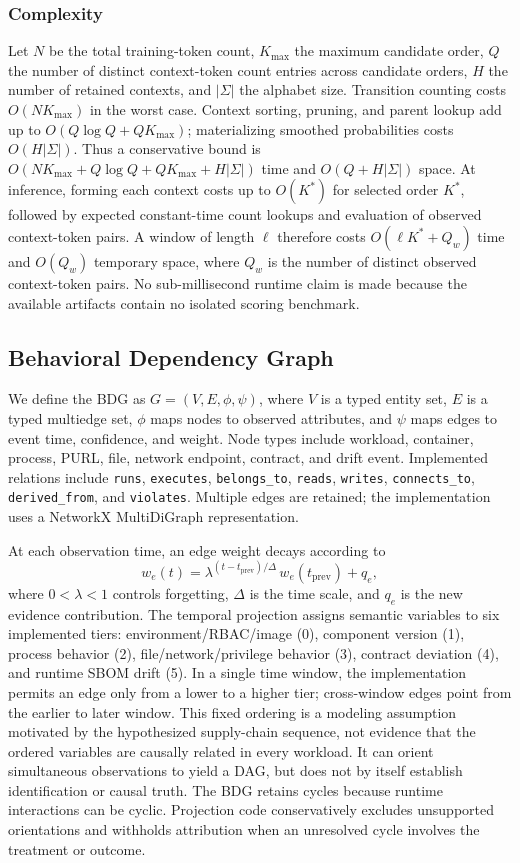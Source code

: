 \documentclass[conference]{IEEEtran}
\begin{document}
\subsubsection{Complexity}
Let $N$ be the total training-token count, $K_{\max}$ the maximum candidate order, $Q$ the number of distinct context-token count entries across candidate orders, $H$ the number of retained contexts, and $|\Sigma|$ the alphabet size. Transition counting costs $O(NK_{\max})$ in the worst case. Context sorting, pruning, and parent lookup add up to $O(Q\log Q+QK_{\max})$; materializing smoothed probabilities costs $O(H|\Sigma|)$. Thus a conservative bound is $O(NK_{\max}+Q\log Q+QK_{\max}+H|\Sigma|)$ time and $O(Q+H|\Sigma|)$ space. At inference, forming each context costs up to $O(K^*)$ for selected order $K^*$, followed by expected constant-time count lookups and evaluation of observed context-token pairs. A window of length $\ell$ therefore costs $O(\ell K^*+Q_w)$ time and $O(Q_w)$ temporary space, where $Q_w$ is the number of distinct observed context-token pairs. No sub-millisecond runtime claim is made because the available artifacts contain no isolated scoring benchmark.

\subsection{Behavioral Dependency Graph}
We define the BDG as $G=(V,E,\phi,\psi)$, where $V$ is a typed entity set, $E$ is a typed multiedge set, $\phi$ maps nodes to observed attributes, and $\psi$ maps edges to event time, confidence, and weight. Node types include workload, container, process, PURL, file, network endpoint, contract, and drift event. Implemented relations include \texttt{runs}, \texttt{executes}, \texttt{belongs\_to}, \texttt{reads}, \texttt{writes}, \texttt{connects\_to}, \texttt{derived\_from}, and \texttt{violates}. Multiple edges are retained; the implementation uses a NetworkX MultiDiGraph representation.

At each observation time, an edge weight decays according to
\begin{equation}
w_e(t)=\lambda^{(t-t_{\mathrm{prev}})/\Delta}\,w_e(t_{\mathrm{prev}})+q_e,
\label{eq:weight-decay}
\end{equation}
where $0<\lambda<1$ controls forgetting, $\Delta$ is the time scale, and $q_e$ is the new evidence contribution. The temporal projection assigns semantic variables to six implemented tiers: environment/RBAC/image (0), component version (1), process behavior (2), file/network/privilege behavior (3), contract deviation (4), and runtime SBOM drift (5). In a single time window, the implementation permits an edge only from a lower to a higher tier; cross-window edges point from the earlier to later window. This fixed ordering is a modeling assumption motivated by the hypothesized supply-chain sequence, not evidence that the ordered variables are causally related in every workload. It can orient simultaneous observations to yield a DAG, but does not by itself establish identification or causal truth. The BDG retains cycles because runtime interactions can be cyclic. Projection code conservatively excludes unsupported orientations and withholds attribution when an unresolved cycle involves the treatment or outcome.
\end{document}
